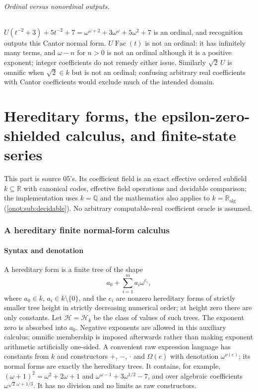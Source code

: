 \documentclass[11pt,oneside]{article}
\numberwithin{equation}{section}
\theoremstyle{definition}
\theoremstyle{remark}
\newcommand{\Q}{\mathbb Q}
\newcommand{\R}{\mathbb R}
\newcommand{\Ralg}{\R_{\mathrm{alg}}}
\newcommand{\Hh}{\mathcal H}
\newcommand{\Fac}{\operatorname{Fac}}
\newcommand{\Om}{\Omega}
\begin{document}
\paragraph{Ordinal versus nonordinal outputs.}
$U(t^{-2}+3)+5t^{-2}+7=\omega^{\omega+2}+3\omega^\omega+5\omega^2+7$ is an
ordinal, and recognition outputs this Cantor normal form. $U\Fac(t)$ is not an
ordinal: it has infinitely many terms, and $\omega-n$ for $n>0$ is not an ordinal
although it is a positive exponent; integer coefficients do not remedy either
issue. Similarly $\sqrt2\,U$ is omnific when $\sqrt2\in k$ but is not an ordinal;
confusing arbitrary real coefficients with Cantor coefficients would exclude much
of the intended domain.

\part{Hereditary forms, the epsilon-zero-shielded calculus, and finite-state series}\label{onot:sh:part}

This part is source 05's. Its coefficient field is an exact effective ordered
subfield $k\subseteq\R$ with canonical codes, effective field operations and
decidable comparison; the implementation uses $k=\Q$ and the mathematics also
applies to $k=\Ralg$ (\cref{onot:sub:decidable}). No arbitrary computable-real
coefficient oracle is assumed.

\section{A hereditary finite normal-form calculus}\label{onot:sh:sec:hereditary}

\subsection{Syntax and denotation}

A hereditary form is a finite tree of the shape
\begin{equation}\label{onot:sh:eq:hereditary}
 a_0+\sum_{i=1}^ma_i\omega^{e_i},
\end{equation}
where $a_0\in k$, $a_i\in k\setminus\{0\}$, and the $e_i$ are nonzero hereditary
forms of strictly smaller tree height in strictly decreasing numerical order; at
height zero there are only constants. Let $\Hh=\Hh_k$ be the class of values of
such trees. The exponent zero is absorbed into $a_0$. Negative exponents are
allowed in this auxiliary calculus; omnific membership is imposed afterwards
rather than making exponent arithmetic artificially one-sided. A convenient raw
expression language has constants from $k$ and constructors $+$, $-$, $\cdot$
and $\Om(e)$ with denotation $\omega^{\nu(e)}$; its normal forms are exactly the
hereditary trees. It contains, for example, $(\omega+1)^2=\omega^2+2\omega+1$ and
$\omega^{\omega-1}+3\omega^{1/2}-7$, and over algebraic coefficients
$\omega^{\sqrt2\,\omega+1/3}$. It has no division and no limits as raw
constructors.
\end{document}
